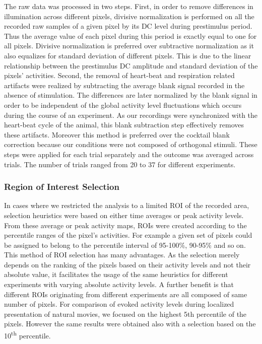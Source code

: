 The raw data was processed in two steps. First, in order to remove
differences in illumination across different pixels, divisive normalization
is performed on all the recorded raw samples of a given pixel by its DC
level during prestimulus period. Thus the average value of each pixel
during this period is exactly equal to one for all pixels. Divisive
normalization is preferred over subtractive normalization as it also
equalizes for standard deviation of different pixels. This is due to the
linear relationship between the prestimulus DC amplitude and standard
deviation of the pixels' activities. Second, the removal of heart-beat and
respiration related artifacts were realized by subtracting the average
blank signal recorded in the absence of stimulation. The differences are
later normalized by the blank signal in order to be independent of the
global activity level fluctuations which occurs during the course of an
experiment. As our recordings were synchronized with the heart-beat cycle
of the animal, this blank subtraction step effectively removes these
artifacts. Moreover this method is preferred over the cocktail blank
correction because our conditions were not composed of orthogonal stimuli.
These steps were applied for each trial separately and the outcome was
averaged across trials. The number of trials ranged from 20 to 37 for
different experiments.

\subsubsection{Region of Interest Selection}

In cases where we restricted the analysis to a limited ROI
 of the recorded area, selection
heuristics were based on either time averages or peak activity levels. From
these average or peak activity maps, ROIs were created according to the
percentile ranges of the pixel's activities. For example a given set of
pixels could be assigned to belong to the percentile interval of 95-100\%,
90-95\% and so on. This method of ROI selection has many advantages. As the
selection merely depends on the ranking of the pixels based on their
activity levels and not their absolute value, it facilitates the usage of
the same heuristics for different experiments with varying absolute
activity levels.  A further benefit is that different ROIs originating from
different experiments are all composed of same number of pixels. For
comparison of evoked activity levels during localized presentation of
natural movies, we focused on the highest 5th percentile of the pixels.
However the same results were obtained also with a selection based on the
10\textsuperscript{th} percentile.

